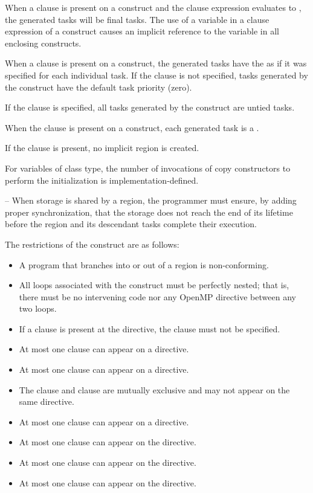 When a  clause is present on a  construct and the  clause expression evaluates to , the generated tasks will be final tasks. The use of a variable in a  clause expression of a  construct causes an implicit reference to the variable in all enclosing constructs.

When a  clause is present on a  construct,
the generated tasks have the  as if it was 
specified for each individual task.  
If the  clause is not specified, tasks generated by 
the  construct have the default task priority (zero).

If the  clause is specified, all tasks generated by the  construct are untied tasks.

When the  clause is present on a  construct, each generated task is a . 

If the  clause is present, no implicit  region is created.

\cppspecificstart
For  variables of class type, the number of invocations of copy constructors to perform the initialization  is implementation-defined.
\cppspecificend

\notestart
\noteheader – When storage is shared by a  region, the programmer must ensure, by adding proper synchronization, that the storage does not reach the end of its lifetime before the  region and its descendant tasks complete their execution.
\noteend

\restrictions
The restrictions of the  construct are as follows:
\begin{itemize}
\item A program that branches into or out of a  region is non-conforming.
\item All loops associated with the  construct must be perfectly nested; that is, there must be no intervening code nor any OpenMP directive between any two loops.
\item If a  clause is present at the  directive, the  clause must not be specified.
\item At most one  clause can appear on a  directive.
\item At most one  clause can appear on a  directive.
\item The  clause and  clause are mutually exclusive and may not appear on the same  directive.
\item At most one  clause can appear on a  directive.
\item At most one  clause can appear on the directive.
\item At most one  clause can appear on the directive. 
\item At most one  clause can appear on the directive.
\end{itemize}

